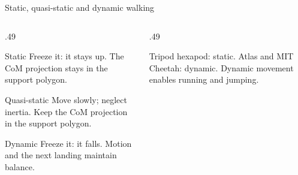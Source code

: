 \documentclass[aspectratio=169]{beamer}
\begin{document}
\begin{frame}[t]{Static, quasi-static and dynamic walking}
\footnotesize
\vspace{0mm}
\begin{columns}[T,onlytextwidth]\begin{column}{.49\textwidth}
\begin{block}{Static}
Freeze it: it stays up. The CoM projection stays in the support polygon.
\end{block}
\vspace{1.5mm}
\begin{block}{Quasi-static}
Move slowly; neglect inertia. Keep the CoM projection in the support polygon.
\end{block}
\vspace{1.5mm}
\begin{block}{Dynamic}
Freeze it: it falls. Motion and the next landing maintain balance.
\end{block}

\end{column}\begin{column}{.49\textwidth}
\centering{}\par\footnotesize Tripod hexapod: static. Atlas and MIT Cheetah: dynamic. Dynamic movement enables running and jumping.
\end{column}\end{columns}
\end{frame}
\end{document}
